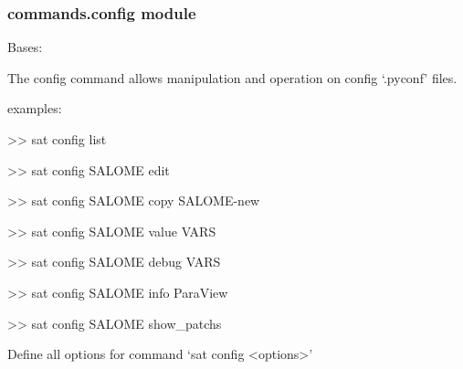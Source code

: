 \documentclass[a4paper,10pt,english]{sphinxmanual}
\begin{document}
\subsubsection{commands.config module}
\label{\detokenize{apidoc_commands/commands:commands-config-module}}\label{\detokenize{apidoc_commands/commands:module-commands.config}}

\begin{fulllineitems}
\label{\detokenize{apidoc_commands/commands:commands.config.Command}}
Bases: 

The config command allows manipulation and operation on config ‘.pyconf’ files.

\begin{DUlineblock}{0em}
\item[] examples:
\item[] \textgreater{}\textgreater{} sat config \textendash{}list
\item[] \textgreater{}\textgreater{} sat config SALOME \textendash{}edit
\item[] \textgreater{}\textgreater{} sat config SALOME \textendash{}copy SALOME-new
\item[] \textgreater{}\textgreater{} sat config SALOME \textendash{}value VARS
\item[] \textgreater{}\textgreater{} sat config SALOME \textendash{}debug VARS
\item[] \textgreater{}\textgreater{} sat config SALOME \textendash{}info ParaView
\item[] \textgreater{}\textgreater{} sat config SALOME \textendash{}show\_patchs
\end{DUlineblock}

\begin{fulllineitems}
\label{\detokenize{apidoc_commands/commands:commands.config.Command.getParser}}
Define all options for command ‘sat config \textless{}options\textgreater{}’

\end{fulllineitems}



\end{fulllineitems}
\end{document}

